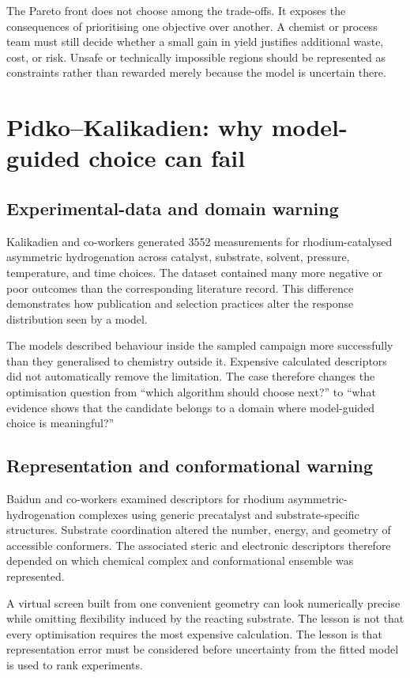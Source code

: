 The Pareto front does not choose among the trade-offs.
It exposes the consequences of prioritising one objective over another.
A chemist or process team must still decide whether a small gain in yield justifies additional waste, cost, or risk.
Unsafe or technically impossible regions should be represented as constraints rather than rewarded merely because the model is uncertain there.

\section{Pidko--Kalikadien: why model-guided choice can fail}

\subsection{Experimental-data and domain warning}

Kalikadien and co-workers generated 3552 measurements for rhodium-catalysed asymmetric hydrogenation across catalyst, substrate, solvent, pressure, temperature, and time choices.
The dataset contained many more negative or poor outcomes than the corresponding literature record.
This difference demonstrates how publication and selection practices alter the response distribution seen by a model.

The models described behaviour inside the sampled campaign more successfully than they generalised to chemistry outside it.
Expensive calculated descriptors did not automatically remove the limitation.
The case therefore changes the optimisation question from ``which algorithm should choose next?'' to ``what evidence shows that the candidate belongs to a domain where model-guided choice is meaningful?''

\subsection{Representation and conformational warning}

Baidun and co-workers examined descriptors for rhodium asymmetric-hydrogenation complexes using generic precatalyst and substrate-specific structures.
Substrate coordination altered the number, energy, and geometry of accessible conformers.
The associated steric and electronic descriptors therefore depended on which chemical complex and conformational ensemble was represented.

A virtual screen built from one convenient geometry can look numerically precise while omitting flexibility induced by the reacting substrate.
The lesson is not that every optimisation requires the most expensive calculation.
The lesson is that representation error must be considered before uncertainty from the fitted model is used to rank experiments.

